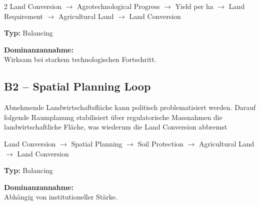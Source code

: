 \documentclass[10pt, a4paper]{article}
\begin{document}
\begin{multicols}{2}
Land Conversion $\rightarrow$ Agrotechnological Progress $\rightarrow$ Yield per ha $\rightarrow$ Land Requirement $\rightarrow$ Agricultural Land $\rightarrow$ Land Conversion 

\textbf{Typ:} Balancing

\textbf{Dominanzannahme:}\\
Wirksam bei starkem technologischen Fortschritt.

\vspace{0.5cm}

\subsection*{B2 – Spatial Planning Loop}
Abnehmende Landwirtschaftsfläche kann politisch problematisiert werden. Darauf folgende Raumplanung stabilisiert über regulatorische Massnahmen die landwirtschaftliche Fläche, was wiederum die Land Conversion abbremst

Land Conversion $\rightarrow$ Spatial Planning $\rightarrow$ Soil Protection $\rightarrow$ Agricultural Land $\rightarrow$ Land Conversion

\textbf{Typ:} Balancing

\textbf{Dominanzannahme:}\\
Abhängig von institutioneller Stärke.

\end{multicols}
\end{document}
